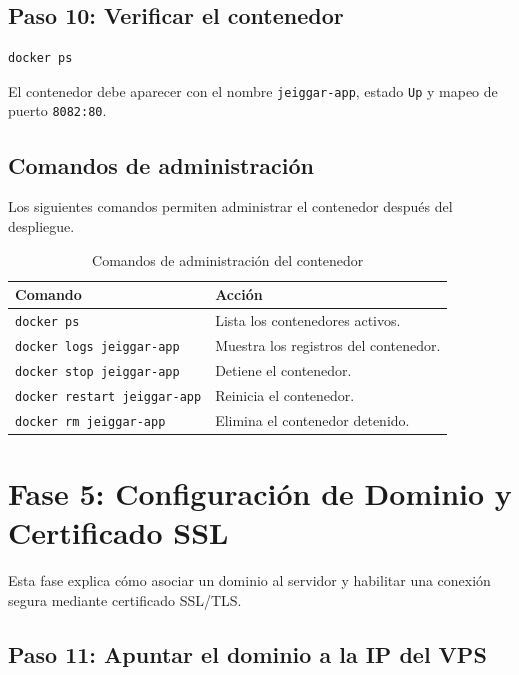 \documentclass[12pt,letterpaper]{article}
\newcommand{\code}[1]{\nolinkurl{#1}}
\begin{document}
\subsection{Paso 10: Verificar el contenedor}

\begin{lstlisting}[language=bash]
docker ps
\end{lstlisting}

El contenedor debe aparecer con el nombre \code{jeiggar-app}, estado \code{Up} y mapeo de puerto \code{8082:80}.

\subsection{Comandos de administración}

Los siguientes comandos permiten administrar el contenedor después del despliegue.

\begin{longtable}{|p{}|p{}|}
\caption{Comandos de administración del contenedor}\\
\hline
\textbf{Comando} & \textbf{Acción} \\
\hline
\code{docker ps} & Lista los contenedores activos. \\
\hline
\code{docker logs jeiggar-app} & Muestra los registros del contenedor. \\
\hline
\code{docker stop jeiggar-app} & Detiene el contenedor. \\
\hline
\code{docker restart jeiggar-app} & Reinicia el contenedor. \\
\hline
\code{docker rm jeiggar-app} & Elimina el contenedor detenido. \\
\hline
\end{longtable}

\section{Fase 5: Configuración de Dominio y Certificado SSL}

Esta fase explica cómo asociar un dominio al servidor y habilitar una conexión segura mediante certificado SSL/TLS.

\subsection{Paso 11: Apuntar el dominio a la IP del VPS}
\end{document}
